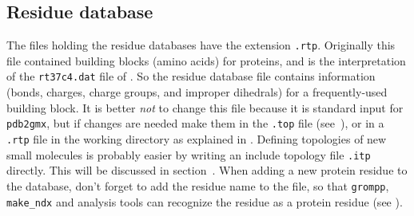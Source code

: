 \subsection{Residue database}
\label{subsec:rtp}
The files holding the residue databases have the extension {\tt .rtp}.
Originally this file contained building blocks (amino acids) for proteins,
and is the {\gromacs} interpretation of the {\tt rt37c4.dat} file of {\gromos}.
So the residue database file contains information (bonds, charges, charge groups,
and improper dihedrals) for a frequently-used building block. It is
better {\em not} to change this file because it is standard input for
{\tt pdb2gmx}, but if changes are needed make them in the
{\tt *.top} file (see~), or in a {\tt .rtp} file
in the working directory as explained in .
Defining topologies of new small molecules is probably easier
by writing an include topology file {\tt *.itp} directly.
This will be discussed in section~.
When adding a new protein residue to the database, don't forget to
add the residue name to the {\tt {}} file,
so that {\tt grompp}, {\tt make\_ndx} and analysis tools can recognize
the residue as a protein residue (see ).

